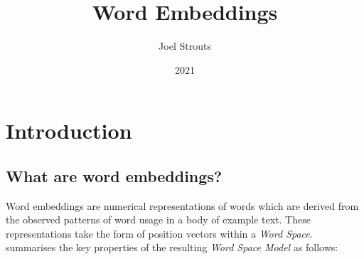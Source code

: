 \documentclass{ucetd}
\title{Word Embeddings}
\author{Joel Strouts}
\date{2021}
\begin{document}
\maketitle


\tableofcontents
\chapter*{Introduction}
\section*{What are word embeddings?}
Word embeddings are numerical representations of words which are derived from the observed patterns of word usage in a body of example text. These representations take the form of position vectors within a \textit{Word Space}. \textcite{shutze-1993-word-space} summarises the key properties of the resulting \textit{Word Space Model} as follows:
\end{document}
